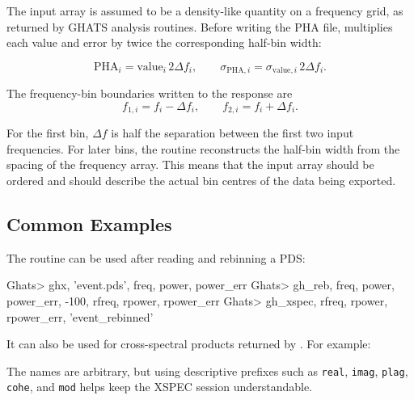 The input  array is assumed to be a density-like quantity on a
frequency grid, as returned by GHATS analysis routines.  Before writing the PHA
file,  multiplies each value and error by twice the
corresponding half-bin width:

\[
  \mathrm{PHA}_i = \mathrm{value}_i \, 2\Delta f_i ,
  \qquad
  \sigma_{\mathrm{PHA},i} =
  \sigma_{\mathrm{value},i} \, 2\Delta f_i .
\]

The frequency-bin boundaries written to the response are
\[
  f_{1,i} = f_i - \Delta f_i, \qquad
  f_{2,i} = f_i + \Delta f_i .
\]

For the first bin, \(\Delta f\) is half the separation between the first two
input frequencies.  For later bins, the routine reconstructs the half-bin width
from the spacing of the frequency array.  This means that the input
 array should be ordered and should describe the actual bin
centres of the data being exported.

\subsection{Common Examples}

The routine can be used after reading and rebinning a PDS:

\begin{ghatsconsole}
Ghats> ghx, 'event.pds', freq, power, power_err
Ghats> gh_reb, freq, power, power_err, -100, rfreq, rpower, rpower_err
Ghats> gh_xspec, rfreq, rpower, rpower_err, 'event_rebinned'
\end{ghatsconsole}

It can also be used for cross-spectral products returned by .
For example:


The names are arbitrary, but using descriptive prefixes such as
\texttt{real}, \texttt{imag}, \texttt{plag}, \texttt{cohe}, and
\texttt{mod} helps keep the XSPEC session understandable.


